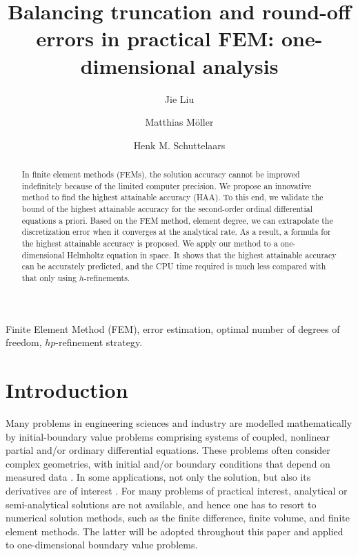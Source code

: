 \documentclass[review,3p]{elsarticle}
\begin{document}

\begin{frontmatter}

\title{Balancing truncation and round-off errors in practical FEM: one-dimensional analysis}

 \author[1]{Jie Liu}
 \author[1]{Matthias M\"oller}
 \author[1]{Henk M. Schuttelaars}
 
 \address[1]{Delft Institute of Applied Mathematics\\ Delft University of Technology\\ Van Mourik Broekmanweg 6, 2628 XE Delft, The Netherlands}

\begin{abstract}
In finite element methods (FEMs), the solution accuracy cannot be improved indefinitely because of the limited computer precision. We propose an innovative method to find the highest attainable accuracy (HAA). To this end, we validate the bound of the highest attainable accuracy for the second-order ordinal differential equations a priori. Based on the FEM method, element degree, we can extrapolate the discretization error when it converges at the analytical rate. As a result, a formula for the highest attainable accuracy is proposed. We apply our method to a one-dimensional Helmholtz equation in space. It shows that the highest attainable accuracy can be accurately predicted, and the CPU time required is much less compared with that only using $h$-refinements. 
\end{abstract}

\begin{keyword}
Finite Element Method (FEM), error estimation, optimal number of degrees of freedom, $hp$-refinement strategy.
\end{keyword}

\end{frontmatter}

\section{Introduction}

Many problems in engineering sciences and industry are modelled mathematically by initial-boundary value problems comprising systems of coupled, nonlinear partial and/or ordinary differential equations. These problems often consider complex geometries, with initial and/or boundary conditions that depend on measured data \cite{Kumar2016}. 
In some applications, not only the solution, but also its derivatives are of interest \cite{Kumar2016,carey1982derivative}.
For many problems of practical interest, analytical or semi-analytical solutions are not available, and hence one has to resort to numerical solution methods, such as the finite difference, finite volume, and finite element methods. The latter will be adopted throughout this paper and applied to one-dimensional boundary value problems.
\end{document}
